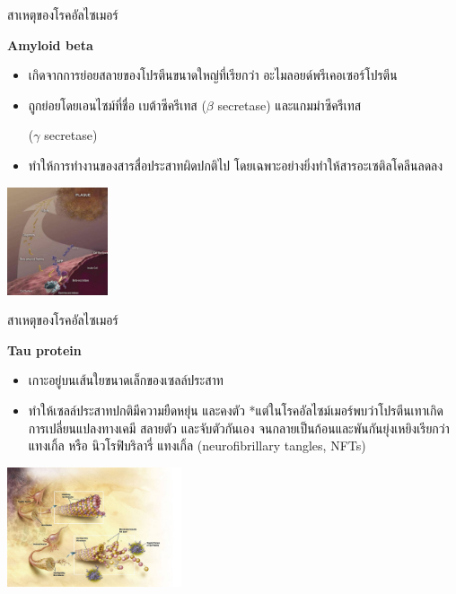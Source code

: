 \documentclass[xetex,serif]{beamer}
\begin{document}
\begin{frame}{สาเหตุของโรคอัลไซเมอร์}

  {\large \textbf{Amyloid beta}}

  \begin{itemize}
    \item เกิดจากการย่อยสลายของโปรตีนขนาดใหญ่ที่เรียกว่า อะไมลอยด์พรีเคอเซอร์โปรตีน
    \item ถูกย่อยโดยเอนไซม์ที่ชื่อ เบต้าซีครีเทส ($\beta$ secretase) และแกมม่าซีครีเทส
    
    ($\gamma$ secretase)
    \item ทำให้การทำงานของสารสื่อประสาทผิดปกติไป โดยเฉพาะอย่างยิ่งทำให้สารอะเซติลโคลีนลดลง  
  \end{itemize}
  \begin{center}
    \includegraphics[height=90pt]{img1.jpg}
  \end{center}
\end{frame}

\begin{frame}{สาเหตุของโรคอัลไซเมอร์}

  {\large \textbf{Tau protein}}

  \begin{itemize}
    \item เกาะอยู่บนเส้นใยขนาดเล็กของเซลล์ประสาท
    \item ทำให้เซลล์ประสาทปกติมีความยืดหยุ่น และคงตัว *แต่ในโรคอัลไซม์เมอร์พบว่าโปรตีนเทาเกิดการเปลี่ยนแปลงทางเคมี สลายตัว และจับตัวกันเอง จนกลายเป็นก้อนและพันกันยุ่งเหยิงเรียกว่า แทงเกิ้ล หรือ นิวโรฟิบริลารี่ แทงเกิ้ล (neurofibrillary tangles, NFTs) 
  \end{itemize}
  \begin{center}
    \includegraphics[height=100pt]{img2.jpg}
  \end{center}
\end{frame}
\end{document}
